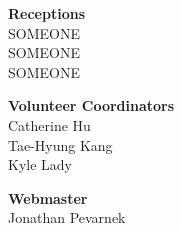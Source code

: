\documentclass[twoside]{article}
\begin{document}
\begin{multicols}{2}
\begin{minipage}{\columnwidth}
\end{minipage}
	\begin{minipage}{\columnwidth}
	{\bf Receptions}\\
	SOMEONE\\
	SOMEONE\\
	SOMEONE\\
	
\end{minipage}
	\begin{minipage}{\columnwidth}
	{\bf Volunteer Coordinators}\\
	Catherine Hu\\
	Tae-Hyung Kang\\
	Kyle Lady\\
	
\end{minipage}
	\begin{minipage}{\columnwidth}
	{\bf Webmaster}\\
	Jonathan Pevarnek\\
	
\end{minipage}
	\end{multicols}\newpage\startcompanysection
{}
\end{document}
